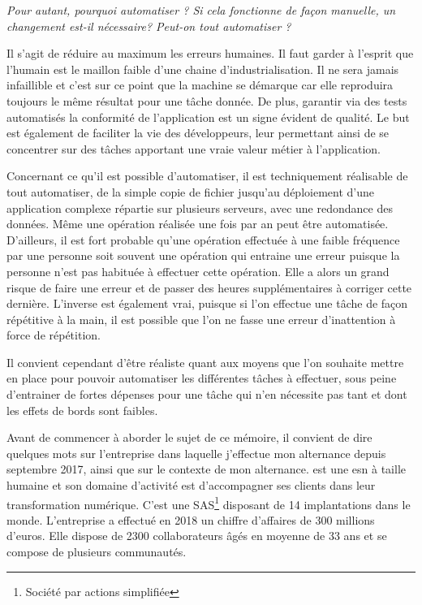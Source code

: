 \emph{Pour autant, pourquoi automatiser ? Si cela fonctionne de façon manuelle, un changement est-il nécessaire? Peut-on tout automatiser ?}

Il s'agit de réduire au maximum les erreurs humaines. Il faut garder à l'esprit que l'humain est le maillon faible d'une chaine d'industrialisation. Il ne sera jamais infaillible et c'est sur ce point que la machine se démarque car elle reproduira toujours le même résultat pour une tâche donnée. De plus, garantir via des tests automatisés la conformité de l'application est un signe évident de qualité. Le but est également de faciliter la vie des développeurs, leur permettant ainsi de se concentrer sur des tâches apportant une vraie valeur métier à l'application.

Concernant ce qu'il est possible d'automatiser, il est techniquement réalisable de tout automatiser, de la simple copie de fichier jusqu'au déploiement d'une application complexe répartie sur plusieurs serveurs, avec une redondance des données. Même une opération réalisée une fois par an peut être automatisée. D'ailleurs, il est fort probable qu'une opération effectuée à une faible fréquence par une personne soit souvent une opération qui entraine une erreur puisque la personne n'est pas habituée à effectuer cette opération. Elle a alors un grand risque de faire une erreur et de passer des heures supplémentaires à corriger cette dernière. L'inverse est également vrai, puisque si l'on effectue une tâche de façon répétitive à la main, il est possible que l'on ne fasse une erreur d'inattention à force de répétition. 

Il convient cependant d'être réaliste quant aux moyens que l'on souhaite mettre en place pour pouvoir automatiser les différentes tâches à effectuer, sous peine d'entrainer de fortes dépenses pour une tâche qui n'en nécessite pas tant et dont les effets de bords sont faibles.

Avant de commencer à aborder le sujet de ce mémoire, il convient de dire quelques mots sur l'entreprise dans laquelle j'effectue mon alternance depuis septembre 2017, \onepoint{} ainsi que sur le contexte de mon alternance. \xmakefirstuc{\onepoint{}} est une \gls{esn} à taille humaine et son domaine d'activité est d'accompagner ses clients dans leur transformation numérique. C'est une SAS\footnote{Société par actions simplifiée} disposant de 14 implantations dans le monde. L'entreprise a effectué en 2018 un chiffre d'affaires de 300 millions d'euros. Elle dispose de 2300 collaborateurs âgés en moyenne de 33 ans et se compose de plusieurs communautés.

